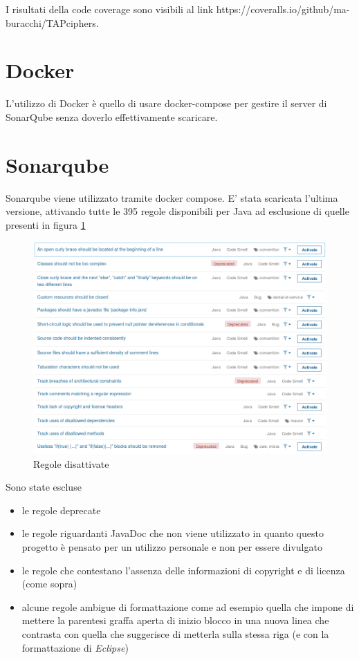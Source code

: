 		I risultati della code coverage sono visibili al link https://coveralls.io/github/ma-buracchi/TAPciphers.
		
	\section{Docker}
		L'utilizzo di Docker è quello di usare docker-compose per gestire il server di SonarQube senza doverlo effettivamente scaricare. 
		
	\section{Sonarqube}
		Sonarqube viene utilizzato tramite docker compose. E' stata scaricata l'ultima versione, attivando tutte le 395 regole disponibili per Java ad esclusione di quelle presenti in figura \ref{fig:sonarules}
		
		\begin{figure}[h]
			\centering
			\includegraphics[scale=0.4]{img/sonarqube_rules}
			\caption{Regole disattivate}
			\label{fig:sonarules}
		\end{figure}
		
		Sono state escluse 
		\begin{itemize}
			\item le regole deprecate
			\item le regole riguardanti JavaDoc che non viene utilizzato in quanto questo progetto è pensato per un utilizzo personale e non per essere divulgato
			\item le regole che contestano l'assenza delle informazioni di copyright e di licenza (come sopra)
			\item alcune regole ambigue di formattazione come ad esempio quella che impone di mettere la parentesi graffa aperta di inizio blocco in una nuova linea che contrasta con quella che suggerisce di metterla sulla stessa riga (e con la formattazione di \emph{Eclipse})
		\end{itemize}
		
